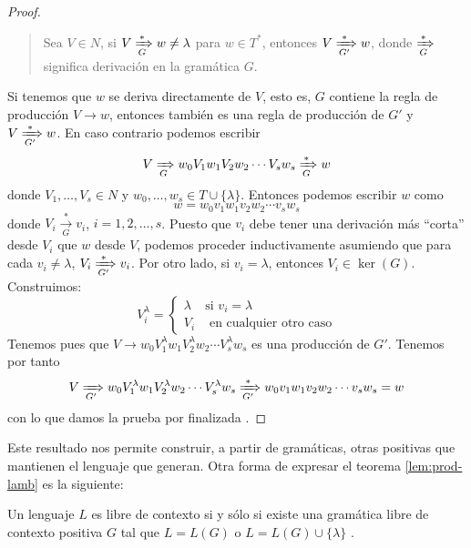 \begin{proof}
\begin{quote}
    Sea $V\in N$, si $V\xRightarrow[G]{*}w\neq\lambda$ para $w\in T^*$, entonces $V\xRightarrow[G']{*}w$, donde 
    $\xRightarrow[G]{*}$ significa derivación en la gramática $G$.
\end{quote}
 Si tenemos que $w$ se deriva directamente de $V$, esto es, $G$ contiene la regla de producción $V\to w$, entonces
también es una regla de producción de $G'$ y $V\xRightarrow[G']{*}w$. En caso contrario podemos escribir
\begin{equation}
    V\xRightarrow[G]{} w_0V_1w_1V_2w_2\cdots V_sw_s\xRightarrow[G]{*}w
\end{equation}
donde $V_1,\dots,V_s\in N$ y $w_0,\dots,w_s\in T\cup\{\lambda\}$. Entonces podemos escribir $w$ como
\begin{equation}
    w=w_0v_1w_1v_2w_2\cdots v_sw_s
\end{equation}
donde $V_i\xrightarrow[G]{*}v_i$, $i=1,2,\dots,s$. Puesto que $v_i$ debe tener una derivación más ``corta'' desde $V_i$
que $w$ desde $V$, podemos proceder inductivamente asumiendo que para cada $v_i\neq\lambda$, 
$V_i\xRightarrow[G']{*}v_i$. Por otro lado, si $v_i=\lambda$, entonces $V_i\in\ker(G)$. Construimos:
\begin{equation}
    V_i^{\lambda}=\begin{cases}
        \lambda & \text{si }v_i=\lambda \\
        V_i & \text{ en cualquier otro caso}
    \end{cases}
\end{equation}
Tenemos pues que $V\to w_0V_1^{\lambda}w_1V_2^{\lambda}w_2\cdots V_s^{\lambda}w_s$ es una producción de $G'$. Tenemos
por tanto
\begin{equation}
    V\xRightarrow[G']{} w_0V_1^{\lambda}w_1V_2^{\lambda}w_2\cdots V_s^{\lambda}w_s\xRightarrow[G']{*}
    w_0v_1w_1v_2w_2\cdots v_sw_s=w
\end{equation}
con lo que damos la prueba por finalizada \cite{davis_sigal_weyuker_1994}.
\end{proof}

Este resultado nos permite construir, a partir de gramáticas, otras positivas que mantienen el lenguaje que generan.
Otra forma de expresar el teorema \ref{lem:prod-lamb} es la siguiente:

\begin{teorema}Un lenguaje $L$ es libre de contexto si y sólo si existe una gramática libre de contexto positiva $G$
tal que $L=L(G)$ o $L=L(G)\cup\{\lambda\}$ \cite{davis_sigal_weyuker_1994}.
\end{teorema}

